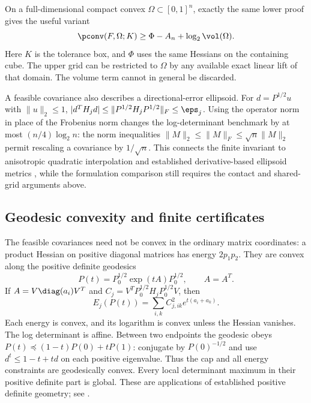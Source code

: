 On a full-dimensional compact convex $\Omega\subset[0,1]^n$, exactly
the same lower proof gives the useful variant
\begin{equation}\label{eq:finite-domain-volume}
 \pconv(F,\Omega;K)\ge\Phi-A_n+\log_2\vol(\Omega).
\end{equation}
Here $K$ is the tolerance box, and $\Phi$ uses the same Hessians on the
containing cube. The upper grid can be restricted to $\Omega$ by any
available exact linear lift of that domain. The volume term cannot in
general be discarded.

A feasible covariance also describes a directional-error ellipsoid. For
$d=P^{1/2}u$ with $\|u\|_2\le1$,
$|d^TH_jd|\le\|P^{1/2}H_jP^{1/2}\|_F\le\eps_j$.
Using the operator norm in place of the Frobenius norm changes the
log-determinant benchmark by at most $(n/4)\log_2n$: the norm inequalities
$\|M\|_2\le\|M\|_F\le\sqrt n\|M\|_2$ permit rescaling a
covariance by $1/\sqrt n$. This connects the finite invariant to
anisotropic quadratic interpolation and established derivative-based
ellipsoid metrics \citep{cao2007}, while the formulation comparison
still requires the contact and shared-grid arguments above.

\subsection{Geodesic convexity and finite certificates}

The feasible covariances need not be convex in the ordinary matrix
coordinates: a product Hessian on positive diagonal matrices has energy
$2p_1p_2$. They are convex along the positive definite geodesics
\[
 P(t)=P_0^{1/2}\exp(tA)P_0^{1/2},\qquad A=A^T.
\]
If $A=V\diag(a_i)V^T$ and $C_j=V^TP_0^{1/2}H_jP_0^{1/2}V$, then
\begin{equation}\label{eq:energy-geodesic}
 E_j(P(t))=\sum_{i,k}C_{j,ik}^2e^{t(a_i+a_k)}.
\end{equation}
Each energy is convex, and its logarithm is convex unless the Hessian
vanishes. The log determinant is affine. Between two endpoints the
geodesic obeys $P(t)\preceq(1-t)P(0)+tP(1)$: conjugate by $P(0)^{-1/2}$
and use $d^t\le1-t+td$ on each positive eigenvalue. Thus the cap and
all energy constraints are geodesically convex. Every local determinant
maximum in their positive definite part is global. These are applications
of established positive definite geometry; see \citet{sra2013}.

